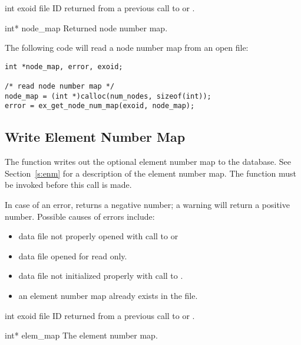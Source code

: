 \begin{parameters}
\item[{int exoid \R{}}]
\exo{} file ID returned from a previous call to  or
.

\item[{int* node_map \W{}}]
Returned node number map.
\end{parameters}

The following code will read a node number map from an open
\exo{} file:

\begin{lstlisting}
int *node_map, error, exoid;

/* read node number map */
node_map = (int *)calloc(num_nodes, sizeof(int));
error = ex_get_node_num_map(exoid, node_map);
\end{lstlisting}

\subsection{Write Element Number Map}

The function  writes out the optional
element number map to the database. See Section~\ref{s:enm} for a
description of the element number map. The function
 must be invoked before this call is made.

In case of an error,  returns a
negative number; a warning will return a positive number. Possible
causes of errors include:

\begin{itemize}

 \item data file not properly opened with call to 
 or 

 \item data file opened for read only.

 \item data file not initialized properly with call to
 .

 \item an element number map already exists in the file.
\end{itemize}




\begin{parameters}
\item[{int exoid \R{}}]
\exo{} file ID returned from a previous call to  or
.

\item[{int* elem_map \R{}}]
The element number map.
\end{parameters}


